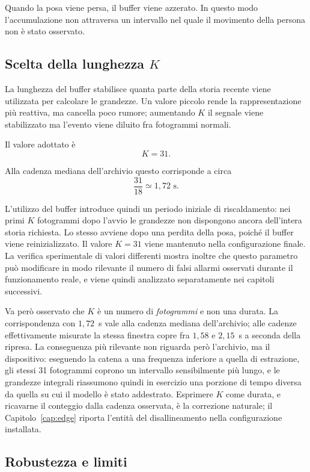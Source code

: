 Quando la posa viene persa, il buffer viene azzerato. In questo modo l'accumulazione non attraversa un intervallo nel quale il movimento della persona non è stato osservato.

\subsection{Scelta della lunghezza \(K\)}

La lunghezza del buffer stabilisce quanta parte della storia recente viene utilizzata per calcolare le grandezze. Un valore piccolo rende la rappresentazione più reattiva, ma cancella poco rumore; aumentando \(K\) il segnale viene stabilizzato ma l'evento viene diluito fra fotogrammi normali.

Il valore adottato è
\[
K=31.
\]

Alla cadenza mediana dell'archivio questo corrisponde a circa
\[
\frac{31}{18}\simeq 1{,}72\text{ s}.
\]

L'utilizzo del buffer introduce quindi un periodo iniziale di riscaldamento: nei primi \(K\) fotogrammi dopo l'avvio le grandezze non dispongono ancora dell'intera storia richiesta. Lo stesso avviene dopo una perdita della posa, poiché il buffer viene reinizializzato. Il valore \(K=31\) viene mantenuto nella configurazione finale. La verifica sperimentale di valori differenti mostra inoltre che questo parametro può modificare in modo rilevante il numero di falsi allarmi osservati durante il funzionamento reale, e viene quindi analizzato separatamente nei capitoli successivi.

Va però osservato che $K$ è un numero di \emph{fotogrammi} e non una durata. La corrispondenza con $1{,}72$~s vale alla cadenza mediana dell'archivio; alle cadenze effettivamente misurate la stessa finestra copre fra $1{,}58$ e $2{,}15$~s a seconda della ripresa. La conseguenza più rilevante non riguarda però l'archivio, ma il dispositivo: eseguendo la catena a una frequenza inferiore a quella di estrazione, gli stessi 31 fotogrammi coprono un intervallo sensibilmente più lungo, e le grandezze integrali riassumono quindi in esercizio una porzione di tempo diversa da quella su cui il modello è stato addestrato. Esprimere $K$ come durata, e ricavarne il conteggio dalla cadenza osservata, è la correzione naturale; il Capitolo~\ref{cap:edge} riporta l'entità del disallineamento nella configurazione installata.

\subsection{Robustezza e limiti}

